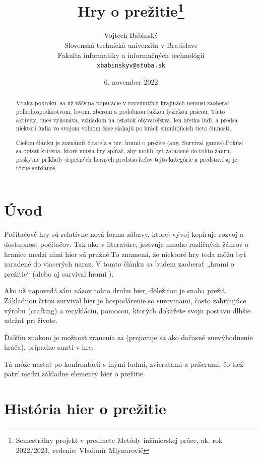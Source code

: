 \documentclass[10pt,oneoside,slovak,a4paper]{article}
\title{Hry o prežitie\thanks{Semestrálny projekt v predmete Metódy inžinierskej práce, ak. rok 2022/2023, vedenie: Vladimír Mlynarovič}} %
\author{Vojtech Babinský\\[2pt]
	{\small Slovenská technická univerzita v Bratislave}\\
	{\small Fakulta informatiky a informačných technológií}\\
	{\small \texttt{xbabinskyv@stuba.sk}}
	}
\date{\small 6. november 2022} %
\begin{document}
\maketitle

\begin{abstract}

Vďaka pokroku, sa už väčšina populácie v rozvinutých krajinách nemusí zaoberať poľnohospodárstvom, lovom, zberom a podobnou ťažkou fyzickou prácou. Tieto aktivity, dnes vykonáva, vzhľadom na ostatok obyvateľstva, len hŕstka ľudí, a predsa niektorí ľudia vo svojom voľnom čase siahajú po hrách simulujúcich tieto činnosti.

Cieľom článku je zoznámiť čitateľa s tzv. hrami o prežite (ang. Survival games).Pokúsi sa opísať kritéria, ktoré musia hry spĺňať, aby mohli byť zaradené do tohto žánru, poskytne príklady  úspešných herných predstaviteľov tejto kategórie a predstaví aj jej rôzne subžánre. 
\end{abstract}


\newpage

\section{Úvod}
Počítačové hry sú relatívne nová forma zábavy, ktorej vývoj kopíruje rozvoj a dostupnosť počítačov. Tak ako v literatúre, jestvuje mnoho rozličných žánrov a hranice medzi nimi hier sú pružné.To znamená, že niektoré hry teda môžu byť zaradené do viacerých naraz. V tomto článku sa budem zaoberať „hrami o prežitie“ (alebo aj survival hrami ). 

Ako už napovedá sám názov tohto druhu hier, dôležitou je snaha prežiť. Základnou črtou survival hier je hospodárenie so surovinami, často zahrňujúce výrobu (crafting) a recykláciu, pomocou, ktorých dokážete svoju postavu dlhšie udržať pri živote. \cite{Pavlovic}

Ďalším znakom je možnosť zranenia sa (prejavuje sa ako dočasné znevýhodnenie hráča), prípadne smrti v hre. 

Tá môže nastať po konfrontácii s inými ľuďmi, zvieratami a príšerami, čo tiež patrí medzi základne elementy hier o prežitie.\cite{Reid}

\section{História hier o prežitie }
\end{document}
